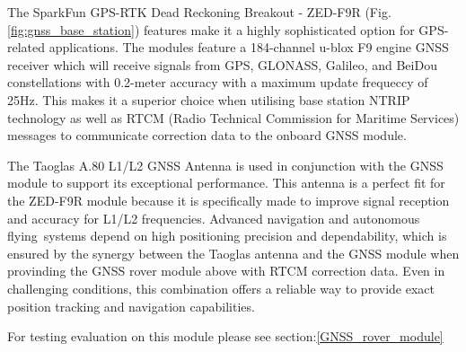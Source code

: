 \documentclass{article}
\begin{document}
The SparkFun GPS-RTK Dead Reckoning Breakout - ZED-F9R
(Fig.\ref{fig:gnss_base_station}) features make it a highly sophisticated option
for GPS-related applications. The modules feature a 184-channel u-blox F9 engine
GNSS receiver which will receive signals from GPS, GLONASS, Galileo, and BeiDou
constellations with 0.2-meter accuracy with a maximum update frequeccy of 25Hz.
This makes it a superior choice when utilising base station NTRIP technology as
well as RTCM (Radio Technical Commission for Maritime Services) messages to
communicate correction data to the onboard GNSS module.

The Taoglas A.80 L1/L2 GNSS Antenna is used in conjunction with the GNSS module
to support its exceptional performance. This antenna is a perfect fit for the
ZED-F9R module because it is specifically made to improve signal reception and
accuracy for L1/L2 frequencies. Advanced navigation and autonomous
flying systems depend on high positioning precision and dependability, which is
ensured by the synergy between the Taoglas antenna and the GNSS module when
provinding the GNSS rover module above with RTCM correction data. Even in
challenging conditions, this combination offers a reliable way to provide exact
position tracking and navigation capabilities.

For testing evaluation on this module please see section:\ref{GNSS_rover_module}
\end{document}
